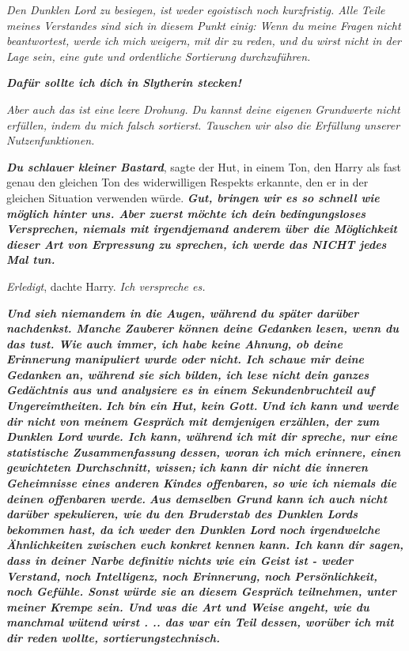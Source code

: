 \emph{Den Dunklen Lord zu besiegen, ist weder egoistisch noch kurzfristig. Alle
Teile meines Verstandes sind sich in diesem Punkt einig: Wenn du meine Fragen
nicht beantwortest, werde ich mich weigern, mit dir zu reden, und du wirst nicht
in der Lage sein, eine gute und ordentliche Sortierung durchzuführen.}

\textbf{\emph{\glqq{}Dafür sollte ich dich in Slytherin stecken!\grqq{}}}

\emph{Aber auch das ist eine leere Drohung. Du kannst deine eigenen Grundwerte
nicht erfüllen, indem du mich falsch sortierst. Tauschen wir also die Erfüllung
unserer Nutzenfunktionen.}

\textbf{\emph{\glqq{}Du schlauer kleiner Bastard\grqq{}}}, sagte der Hut, in
einem Ton, den Harry als fast genau den gleichen Ton des widerwilligen Respekts
erkannte, den er in der gleichen Situation verwenden würde. \textbf{\emph{\glqq{}
Gut, bringen wir es so schnell wie möglich hinter uns. Aber zuerst möchte ich
dein bedingungsloses Versprechen, niemals mit irgendjemand anderem über die
Möglichkeit dieser Art von Erpressung zu sprechen, ich werde das NICHT jedes Mal
tun.\grqq{}}}

\emph{Erledigt}, dachte Harry. \emph{Ich verspreche es.}

\textbf{\emph{\glqq{}Und sieh niemandem in die Augen, während du später darüber
nachdenkst. Manche Zauberer können deine Gedanken lesen, wenn du das tust. Wie
auch immer, ich habe keine Ahnung, ob deine Erinnerung manipuliert wurde oder
nicht. Ich schaue mir deine Gedanken an, während sie sich bilden, ich lese nicht
dein ganzes Gedächtnis aus und analysiere es in einem Sekundenbruchteil auf
Ungereimtheiten.}} \textbf{\emph{Ich bin ein Hut, kein Gott.}} \textbf{\emph{Und
ich kann und werde dir nicht von meinem Gespräch mit demjenigen erzählen, der
zum Dunklen Lord wurde. Ich kann, während ich mit dir spreche, nur eine
statistische Zusammenfassung dessen, woran ich mich erinnere, einen gewichteten
Durchschnitt, wissen;} } \textbf{\emph{ich kann dir nicht die inneren
Geheimnisse eines anderen Kindes offenbaren, so wie ich niemals die deinen
offenbaren werde.}} \textbf{\emph{Aus demselben Grund kann ich auch nicht
darüber spekulieren, wie du den Bruderstab des Dunklen Lords bekommen hast, da
ich weder den Dunklen Lord noch irgendwelche Ähnlichkeiten zwischen euch konkret
kennen kann. Ich kann dir sagen, dass in deiner Narbe definitiv nichts wie ein
Geist ist - weder Verstand, noch Intelligenz, noch Erinnerung, noch
Persönlichkeit, noch Gefühle. Sonst würde sie an diesem Gespräch teilnehmen,
unter meiner Krempe sein. Und was die Art und Weise angeht, wie du manchmal
wütend wirst . .. das war ein Teil dessen, worüber ich mit dir reden wollte,
sortierungstechnisch.\grqq{}}}

